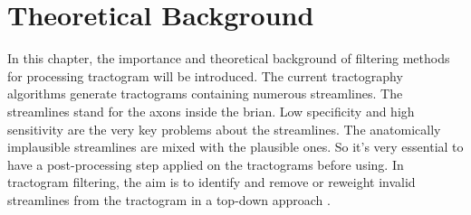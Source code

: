 \chapter{Theoretical Background}

In this chapter, the importance and theoretical background of filtering methods for processing tractogram will be introduced.
The current tractography algorithms generate tractograms containing numerous streamlines. The streamlines stand for the axons inside the brian.
Low specificity and high sensitivity are the very key problems about the streamlines. The anatomically implausible streamlines are mixed with the plausible ones.
So it's very essential to have a post-processing step applied on the tractograms before using. 
In tractogram filtering, the aim is to identify and remove or reweight invalid streamlines from the tractogram in a top-down approach \cite{jeurissenDiffusionMRIFiber2019}.







